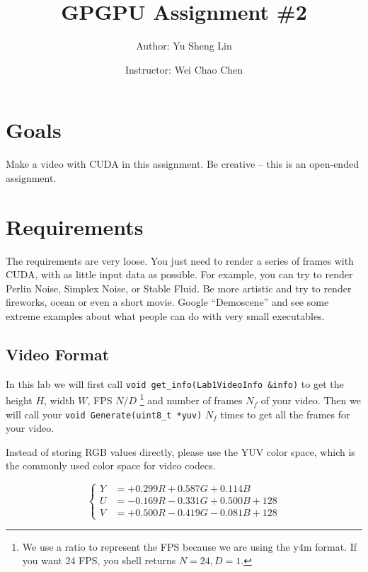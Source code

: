 \documentclass[12pt,a4paper]{article}
\begin{document}
\title{GPGPU Assignment \#2}
\author{Author: Yu Sheng Lin \and Instructor: Wei Chao Chen}
\maketitle

\section{Goals}

Make a video with CUDA in this assignment.  Be creative -- this is an open-ended assignment.

\section{Requirements}

The requirements are very loose.  You just need to render a series of frames with CUDA, with as little input data as possible.
For example, you can try to render Perlin Noise, Simplex Noise, or Stable Fluid.
Be more artistic and try to render fireworks, ocean or even a short movie.
Google ``Demoscene'' and see some extreme examples about what people can do with very small executables.

\subsection{Video Format}

In this lab we will first call \verb+void get_info(Lab1VideoInfo &info)+
to get the height $H$, width $W$, FPS
$N/D$ \footnote{We use a ratio to represent the FPS because we are using the y4m format. If you want 24 FPS, you shell returns $N = 24, D = 1$.}
and number of frames $N_f$ of your video.
Then we will call your \verb+void Generate(uint8_t *yuv)+ $N_f$ times to get all the frames for your video.

Instead of storing RGB values directly,
please use the YUV color space, which is the commonly used color space for video codecs.

\begin{equation}
\left\lbrace
\begin{aligned}
Y &= +0.299R+0.587G+0.114B\\
U &= -0.169R-0.331G+0.500B+128\\
V &= +0.500R-0.419G-0.081B+128
\end{aligned}
\right.
\end{equation}
\end{document}
